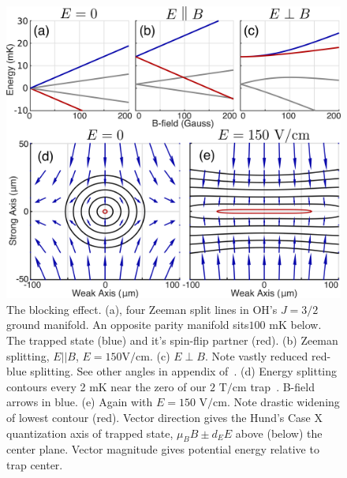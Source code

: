 \documentclass[%
 reprint,
groupedaddress,
 amsmath,amssymb,
 aps,
prl,
]{revtex4-1}
\newcommand{\epb}{$E\!\perp\!B$}
\begin{document}

\begin{figure}[tb]
\includegraphics[width=\linewidth]{Blocking/blocking.png}%
\caption{
The blocking effect. (a), four Zeeman split lines in OH's $J=3/2$ ground manifold. An opposite parity manifold sits$100\text{ mK}$ below. The trapped state (blue) and it's spin-flip partner (red). (b) Zeeman splitting, $E||B$, $E=150\text{V/cm}$. (c) \epb. Note vastly reduced red-blue splitting. See other angles in appendix of~\cite{Stuhl2013}. (d) Energy splitting contours every 2 mK near the zero of our $2\text{ T/cm}$ trap~\cite{Stuhl2012uwave}. B-field arrows in blue. (e) Again with $E=150\text{ V/cm}$. Note drastic widening of lowest contour (red). Vector direction gives the Hund's Case X quantization axis of trapped state, $\mu_BB\pm d_EE$ above (below) the center plane. Vector magnitude gives potential energy relative to trap center. 
\label{fig:blocking}}
\end{figure}

\end{document}
